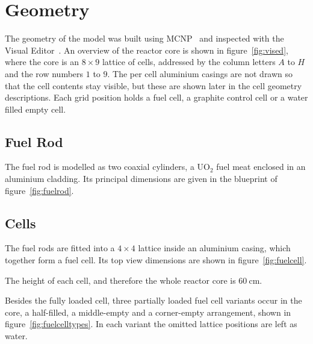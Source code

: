 \section{Geometry}

The geometry of the model was built using MCNP~\cite{primer} and inspected with the Visual Editor~\cite{vised}.
An overview of the reactor core is shown in figure~\ref{fig:vised}, where the core is an $8\times9$ lattice of cells, addressed by the column letters $A$ to $H$ and the row numbers $1$ to $9$.
The per cell aluminium casings are not drawn so that the cell contents stay visible, but these are shown later in the cell geometry descriptions.
Each grid position holds a fuel cell, a graphite control cell or a water filled empty cell.



\newpage

\subsection{Fuel Rod}

The fuel rod is modelled as two coaxial cylinders, a UO$_2$ fuel meat enclosed in an aluminium cladding.
Its principal dimensions are given in the blueprint of figure~\ref{fig:fuelrod}.



\subsection{Cells}

The fuel rods are fitted into a $4\times4$ lattice inside an aluminium casing, which together form a fuel cell.
Its top view dimensions are shown in figure~\ref{fig:fuelcell}.



The height of each cell, and therefore the whole reactor core is $60~\mathrm{cm}$.

\newpage

Besides the fully loaded cell, three partially loaded fuel cell variants occur in the core, a half-filled, a middle-empty and a corner-empty arrangement, shown in figure~\ref{fig:fuelcelltypes}.
In each variant the omitted lattice positions are left as water.



